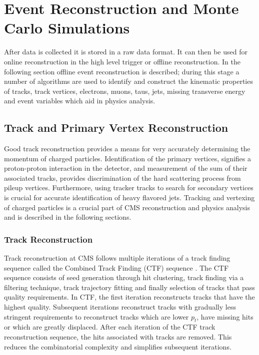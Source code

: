 \chapter{Event Reconstruction and Monte Carlo Simulations}
After data is collected it is stored in a raw data format.
It can then be used for online reconstruction in the high level trigger
or offline reconstruction. 
In the following section offline event reconstruction is described;
during this stage a number of algorithms are used to identify and
construct the kinematic properties 
of tracks, track vertices,  electrons, muons, taus, jets, missing transverse energy and 
event variables which aid in physics analysis.  
\section{Track and Primary Vertex Reconstruction}
Good track reconstruction provides a means for very accurately determining
the momentum of charged particles.
Identification of the primary vertices, signifies a proton-proton interaction in the detector, and 
measurement of the sum of their associated tracks, 
provides discrimination of the hard scattering process 
from pileup vertices.
Furthermore, using tracker tracks to search for secondary vertices
is crucial for accurate identification of heavy flavored jets.
Tracking and vertexing of charged particles is a crucial part of CMS reconstruction
and physics analysis and is described in the following sections.
\subsection{Track Reconstruction}
\label{sec:TrackReco}
Track reconstruction at CMS follows multiple iterations of a track finding sequence
called the Combined Track Finding (CTF) sequence \cite{CMSTDRPhysics}. 
The CTF sequence consists of seed generation through hit clustering,
track finding via a filtering technique, track trajectory fitting and finally
selection of tracks that pass quality requirements. 
In CTF, the first iteration reconstructs tracks that
have the highest quality. Subsequent iterations reconstruct
tracks with gradually less stringent requirements 
to reconstruct tracks which are lower $p_{t}$, have missing hits or which are greatly displaced.
After each iteration of the CTF track reconstruction sequence, the hits
associated with tracks are removed. This reduces the combinatorial complexity
and simplifies subsequent iterations.%

